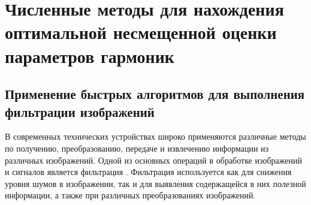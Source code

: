 %
%
%


\chapter{Численные методы для нахождения оптимальной несмещенной оценки параметров гармоник}\label{ch:ch3}

\section{Применение быстрых алгоритмов для выполнения фильтрации изображений} \label{sec:ch3/sect1}

В современных технических устройствах широко применяются различные методы по получению, преобразованию, передаче и извлечению информации из различных изображений. Одной из основных операций в обработке изображений и сигналов является фильтрация \cite{gonzalez2018digital}. 
Фильтрация используется как для снижения уровня шумов в изображении, так и для выявления содержащейся в них полезной информации, а также при различных преобразованиях изображений.

